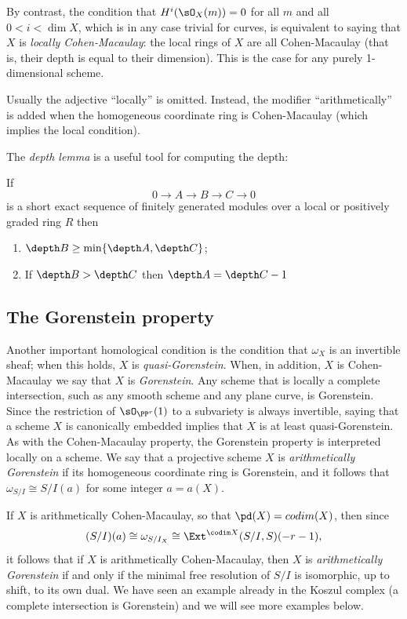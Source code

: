 By contrast, the condition
that $H^i(\sO_X(m)) = 0$ for all $m$ and all $0<i<\dim X$, which is in any case trivial for curves, is 
equivalent to saying that $X$ is \emph{locally Cohen-Macaulay}: the local rings of $X$ are all Cohen-Macaulay (that is, their depth is equal to their dimension). This is the case for any purely 1-dimensional scheme. 

Usually the adjective ``locally'' is omitted. Instead, the 
modifier ``arithmetically'' is added when the homogeneous coordinate ring is Cohen-Macaulay (which implies the local condition).

The \emph{depth lemma} \cite[***]{Eisenbud1995} is a useful tool for computing the depth:

\begin{lemma}\label{depth lemma}
If 
$$
0\to A\to B\to C\to 0
$$
is a short exact sequence of finitely generated modules over a local or positively graded ring $R$ then
\begin{enumerate}
\item $\depth B \geq \min\{\depth A, \depth C\}$;
 \item If $\depth B>\depth C$ then $\depth A = \depth C -1$
\end{enumerate}
\end{lemma}


\subsection{The Gorenstein property} 
Another important homological condition is the condition that $\omega_X$ is an invertible sheaf; when this holds, $X$ is \emph{quasi-Gorenstein}. When, in addition, $X$ is Cohen-Macaulay we say that $X$ is \emph{Gorenstein}. Any scheme that is locally a complete intersection, such as any smooth scheme and any plane curve, is Gorenstein. Since the restriction
of $\sO_{\PP^r}(1)$ to a subvariety is always invertible, saying that a scheme $X$ is canonically embedded implies that
$X$ is at least quasi-Gorenstein. As with the Cohen-Macaulay property, the Gorenstein property is interpreted locally
on a scheme. We say that a projective scheme $X$ is \emph{arithmetically Gorenstein}
if its homogeneous coordinate ring is Gorenstein, and it follows that $\omega_{S/I} \cong S/I(a)$ for some integer $a = a(X)$.

If $X$ is arithmetically Cohen-Macaulay, so that
$\pd(X) = codim(X)$,  then since 
$$
(S/I)(a) \cong \omega_{S/I_X} \cong \Ext^{\codim X}(S/I, S)(-r-1),
$$
it follows that if $X$ is arithmetically Cohen-Macaulay, then $X$ is  \emph{arithmetically Gorenstein} if and only if
the  minimal free resolution of $S/I$ is isomorphic, up to shift, to its own dual. We have seen an example already
in the Koszul complex (a complete intersection is Gorenstein) and we will see more examples
below.


